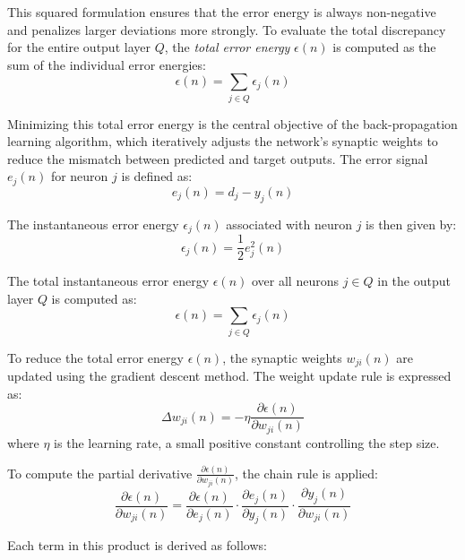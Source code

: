 This squared formulation ensures that the error energy is always non-negative and penalizes larger deviations more strongly. To evaluate the total discrepancy for the entire output layer \( Q \), the \textit{total error energy} \( \epsilon(n) \) is computed as the sum of the individual error energies:
\begin{equation}
	\epsilon(n) = \sum_{j \in Q} \epsilon_j(n)
\end{equation}

Minimizing this total error energy is the central objective of the back-propagation learning algorithm, which iteratively adjusts the network’s synaptic weights to reduce the mismatch between predicted and target outputs. The error signal $e_j(n)$ for neuron $j$ is defined as:
\begin{equation}
	e_j(n) = d_j - y_j(n)
\end{equation}

The instantaneous error energy $\epsilon_j(n)$ associated with neuron $j$ is then given by:
\begin{equation}
	\epsilon_j(n) = \frac{1}{2} e_j^2(n)
\end{equation}

The total instantaneous error energy $\epsilon(n)$ over all neurons $j \in Q$ in the output layer $Q$ is computed as:
\begin{equation}
	\epsilon(n) = \sum_{j \in Q} \epsilon_j(n)
\end{equation}

To reduce the total error energy $\epsilon(n)$, the synaptic weights $w_{ji}(n)$ are updated using the gradient descent method. The weight update rule is expressed as:
\begin{equation} \label{weight_update_equation}
	\Delta w_{ji}(n) = -\eta \frac{\partial \epsilon(n)}{\partial w_{ji}(n)}
\end{equation}
where $\eta$ is the learning rate, a small positive constant controlling the step size.

To compute the partial derivative $\frac{\partial \epsilon(n)}{\partial w_{ji}(n)}$, the chain rule is applied:
\begin{equation} \label{nn_partial_derivative}
	\frac{\partial \epsilon(n)}{\partial w_{ji}(n)} =
	\frac{\partial \epsilon(n)}{\partial e_j(n)} \cdot
	\frac{\partial e_j(n)}{\partial y_j(n)} \cdot
	\frac{\partial y_j(n)}{\partial w_{ji}(n)}
\end{equation}

Each term in this product is derived as follows:


